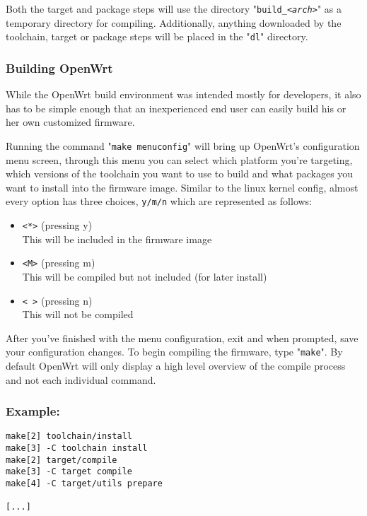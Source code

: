 Both the target and package steps will use the directory "\texttt{build\_\textit{<arch>}}"
as a temporary directory for compiling. Additionally, anything downloaded by the toolchain,
target or package steps will be placed in the "\texttt{dl}" directory.


\subsubsection{Building OpenWrt}

While the OpenWrt build environment was intended mostly for developers, it also has to be
simple enough that an inexperienced end user can easily build his or her own customized firmware.

Running the command "\texttt{make menuconfig}" will bring up OpenWrt's configuration menu
screen, through this menu you can select which platform you're targeting, which versions of
the toolchain you want to use to build and what packages you want to install into the 
firmware image. Similar to the linux kernel config, almost every option has three choices, 
\texttt{y/m/n} which are represented as follows:

\begin{itemize}
	\item{\texttt{<*>} (pressing y)} \\
		This will be included in the firmware image
	\item{\texttt{<M>} (pressing m)} \\
		This will be compiled but not included (for later install)
	\item{\texttt{< >} (pressing n)} \\
		This will not be compiled
\end{itemize}

After you've finished with the menu configuration, exit and when prompted, save your 
configuration changes. To begin compiling the firmware, type "\texttt{make}". By default
OpenWrt will only display a high level overview of the compile process and not each individual
command.

\subsubsection{Example:}

\begin{Verbatim}
make[2] toolchain/install
make[3] -C toolchain install
make[2] target/compile
make[3] -C target compile
make[4] -C target/utils prepare

[...]
\end{Verbatim}

